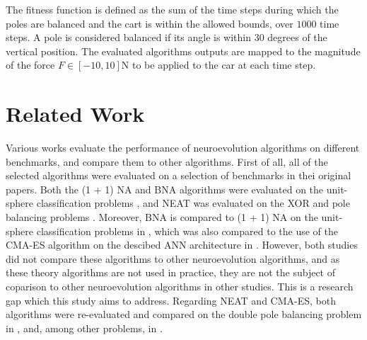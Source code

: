 The fitness function is defined as the sum of the time steps during which the poles are balanced and the cart is within the allowed bounds, over $1000$ time steps.
A pole is considered balanced if its angle is within $30$ degrees of the vertical position.
The evaluated algorithms outputs are mapped to the magnitude of the force $F \in [-10, 10]$N to be applied to the car at each time step.

\section{Related Work}

Various works evaluate the performance of neuroevolution algorithms on different benchmarks, and compare them to other algorithms.
First of all, all of the selected algorithms were evaluated on a selection of benchmarks in thei original papers.
Both the (1 + 1) NA and BNA algorithms were evaluated on the unit-sphere classification problems \cite{na, bna}, and NEAT was evaluated on the XOR and pole balancing problems \cite{neat}.
Moreover, BNA is compared to (1 + 1) NA on the unit-sphere classification problems in \cite{bna}, which was also compared to the use of the CMA-ES algorithm on the descibed ANN architecture in
\cite{na}. However, both studies did not compare these algorithms to other neuroevolution algorithms, and as these theory algorithms are not used in practice, they are not the subject of
coparison to other neuroevolution algorithms in other studies. This is a research gap which this study aims to address.
Regarding NEAT and CMA-ES, both algorithms were re-evaluated and compared on the double pole balancing problem in \cite{neuroevolution_es_rl}, and, among other problems, in \cite{robust}.

